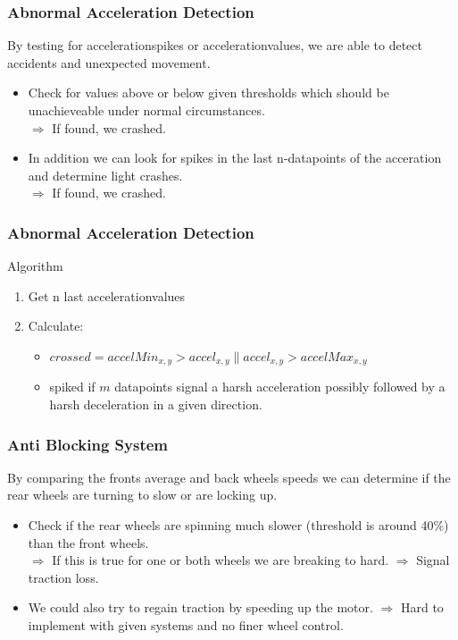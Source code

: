 \documentclass{beamer}
\begin{document}
\begin{frame}
    \frametitle{Abnormal Acceleration Detection}
    By testing for accelerationspikes or accelerationvalues, we are able to detect accidents and unexpected movement.\\
    \begin{itemize}
     \item Check for values above or below given thresholds which should be unachieveable under normal circumstances.\\
     $\Rightarrow$ If found, we crashed.
     \item In addition we can look for spikes in the last n-datapoints of the acceration and determine light crashes.\\
     $\Rightarrow$ If found, we crashed.
    \end{itemize}
\end{frame}
\begin{frame}
    \frametitle{Abnormal Acceleration Detection}
    Algorithm
    \begin{enumerate}
        \item Get n last accelerationvalues
        \item Calculate: 
        \begin{itemize}
            \item $crossed = accelMin_{x,y} > accel_{x,y} \parallel accel_{x,y} > accelMax_{x,y}$
            \item spiked if $m$ datapoints signal a harsh acceleration possibly followed by a harsh deceleration in a given direction.
        \end{itemize}
    \end{enumerate}
\end{frame}

\begin{frame}
    \frametitle{Anti Blocking System}
    By comparing the fronts average and back wheels speeds we can determine if the rear wheels are turning to slow or are locking up. 
    \begin{itemize}
     \item Check if the rear wheels are spinning much slower (threshold is around 40\%) than the front wheels.\\
     $\Rightarrow$ If this is true for one or both wheels we are breaking to hard.
     $\Rightarrow$ Signal traction loss.
     \item We could also try to regain traction by speeding up the motor. 
     $\Rightarrow$ Hard to implement with given systems and no finer wheel control. \\
    \end{itemize}
\end{frame}
\end{document}
